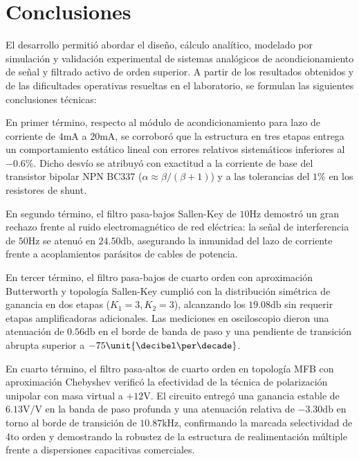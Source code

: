\chapter{Conclusiones}
El desarrollo permitió abordar el diseño, cálculo analítico, modelado por simulación y validación experimental de
sistemas analógicos de acondicionamiento de señal y filtrado activo de orden superior. A partir de los resultados
obtenidos y de las dificultades operativas resueltas en el laboratorio, se formulan las siguientes conclusiones
técnicas:

En primer término, respecto al módulo de acondicionamiento para lazo de corriente de $4 \unit{\milli\ampere}$ a
$20 \unit{\milli\ampere}$, se corroboró que la estructura en tres etapas entrega un comportamiento estático lineal
con errores relativos sistemáticos inferiores al $-0.6\%$. Dicho desvío se atribuyó con exactitud a la corriente de
base del transistor bipolar NPN BC337 ($\alpha \approx \beta/(\beta+1)$) y a las tolerancias del $1\%$ en los
resistores de shunt.

En segundo término, el filtro pasa-bajos Sallen-Key de $10 \unit{\hertz}$ demostró un gran rechazo frente al ruido
electromagnético de red eléctrica: la señal de interferencia de $50 \unit{\hertz}$ se atenuó en $24.50 \unit{\decibel}$,
asegurando la inmunidad del lazo de corriente frente a acoplamientos parásitos de cables de potencia.

En tercer término, el filtro pasa-bajos de cuarto orden con aproximación Butterworth y topología Sallen-Key cumplió con
la distribución simétrica de ganancia en dos etapas ($K_1 = 3, K_2 = 3$), alcanzando los $19.08 \unit{\decibel}$ sin
requerir etapas amplificadoras adicionales. Las mediciones en osciloscopio dieron una atenuación de $0.56
\unit{\decibel}$ en el borde de banda de paso y una pendiente de transición abrupta superior a $-75
\unit{\decibel\per\decade}$.

En cuarto término, el filtro pasa-altos de cuarto orden en topología MFB con aproximación Chebyshev verificó la
efectividad de la técnica de polarización unipolar con masa virtual a $+12 \unit{\volt}$. El circuito entregó una
ganancia estable de $6.13 \unit{\volt\per\volt}$ en la banda de paso profunda y una atenuación relativa de $-3.30
\unit{\decibel}$ en torno al borde de transición de $10.87 \unit{\kilo\hertz}$, confirmando la marcada selectividad de
4to orden y demostrando la robustez de la estructura de realimentación múltiple frente a dispersiones capacitivas
comerciales.

